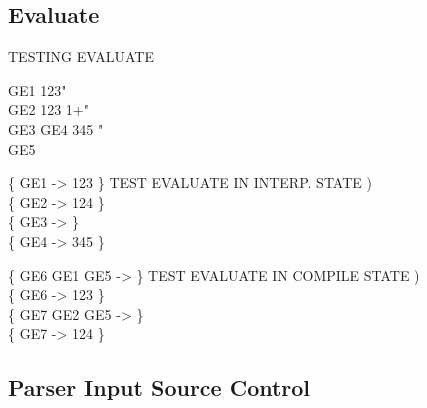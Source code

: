 \subsection{Evaluate}

\begin{tt}
TESTING EVALUATE

\word{:} GE1  123" \word{;}  \\
\word{:} GE2  123 1+" \word{;}  \\
\word{:} GE3  \word{:} GE4 345 \word{;}" \word{;} \\
\word{:} GE5  \word{;} 

\{ GE1  -> 123 \} \tab[3]  TEST EVALUATE IN INTERP. STATE ) \\
\{ GE2  -> 124 \} \\
\{ GE3  ->     \} \\
\{ GE4                 -> 345 \}

\{ \word{:} GE6 GE1 GE5 \word{;} -> \} \tab[3.4]  TEST EVALUATE IN COMPILE STATE ) \\
\{ GE6 -> 123 \} \\
\{ \word{:} GE7 GE2 GE5 \word{;} -> \} \\
\{ GE7 -> 124 \} \\
\end{tt}

\subsection{Parser Input Source Control}

